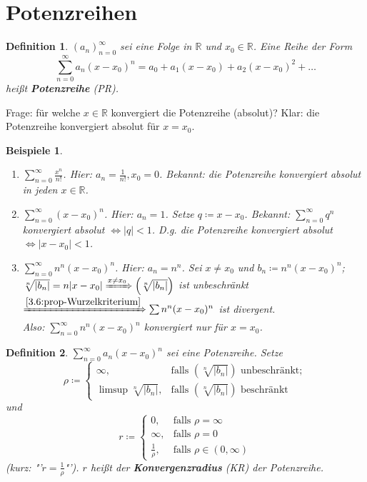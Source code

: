 \documentclass[titlepage,ngerman,a4paper,headsepline]{scrartcl}
\newcommand{\R}{\mathbb{R}}
\theoremstyle{named}
\theoremstyle{dotless}
\newtheorem*{beispiele}{Beispiele}
\newtheorem*{definition}{Definition}
\begin{document}
\newpage


\section{Potenzreihen}

\begin{definition}
	$(a_{n})_{n=0}^{\infty}$ sei eine Folge in $\R$ und $x_{0} \in \R$. Eine Reihe der Form
		$$ \sum_{n=0}^{\infty} a_{n} (x - x_{0})^{n} = a_{0} + a_{1} (x - x_{0}) + a_{2} (x - x_{0})^{2} + \dotsc $$
		hei{\ss}t \textbf{Potenzreihe} (PR). 
\end{definition}

Frage: für welche $x \in \R$ konvergiert die Potenzreihe (absolut)? Klar: die Potenzreihe konvergiert absolut für $x = x_{0}$.

\begin{beispiele} ~\
	\begin{enumerate}
		\item $\sum_{n=0}^{\infty} \frac{x^{n}}{n!}$. Hier: $a_{n} = \frac{1}{n!}, x_{0} = 0$. Bekannt: die Potenzreihe konvergiert absolut in jeden $x \in \R$.
		\item $\sum_{n=0}^{\infty} (x - x_{0})^{n}$. Hier: $a_{n} = 1$. Setze $q \coloneqq x - x_{0}$. Bekannt: $\sum_{n=0}^{\infty} q^{n}$ konvergiert absolut $\iff |q| < 1$. D.g. die Potenzreihe konvergiert absolut $\iff |x - x_{0} | < 1$.
		\item $\sum_{n=0}^{\infty} n^{n} (x - x_{0})^{n}$. Hier: $a_{n} = n^{n}$. Sei $x \neq x_{0}$ und $b_{n} \coloneqq n^{n} (x - x_{0})^{n}$; $\sqrt[n]{|b_{n}|} = n |x - x_{0}| \xRightarrow[]{x \neq x_{0}} \left( \sqrt[n]{|b_{n}|} \right)$ ist unbeschränkt $\xRightarrow[]{\ref{3.6:prop-Wurzelkriterium}} \sum n^{n} (x - x_{0})^{n}$ ist divergent. \\
			Also: $\sum_{n=0}^{\infty} n^{n} (x - x_{0})^{n}$ konvergiert nur für $x = x_{0}$.
	\end{enumerate}	
\end{beispiele}

\begin{definition}
	$\sum_{n=0}^{\infty} a_{n} (x - x_{0})^{n}$ sei eine Potenzreihe. Setze
		$$ \rho \coloneqq \begin{cases}
			\infty, & \text{falls } \left( \sqrt[n]{|b_{n}|} \right) \text{ unbeschränkt}; \\
			\limsup \sqrt[n]{|b_{n}|}, & \text{falls } \left( \sqrt[n]{|b_{n}|} \right) \text{ beschränkt}
		\end{cases} $$
	und
		$$ r \coloneqq \begin{cases}
			0, & \text{falls } \rho = \infty \\
			\infty, & \text{falls } \rho = 0 \\
			\frac{1}{\rho}, & \text{falls } \rho \in (0, \infty)
		\end{cases} $$
	(kurz: "'$r = \frac{1}{\rho}$"'). $r$ hei{\ss}t der \textbf{Konvergenzradius} (KR) der Potenzreihe.
\end{definition}
\end{document}
